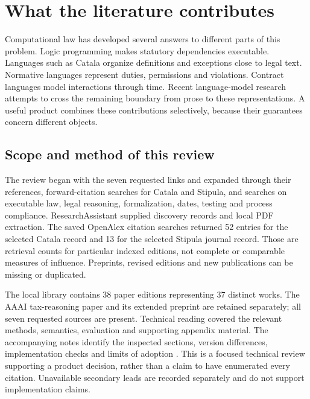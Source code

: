 \section{What the literature contributes}
\label{sec:literature}

Computational law has developed several answers to different parts of this
problem. Logic programming makes statutory dependencies executable. Languages
such as Catala organize definitions and exceptions close to legal text. Normative
languages represent duties, permissions and violations. Contract languages model
interactions through time. Recent language-model research attempts to cross the
remaining boundary from prose to these representations. A useful product combines
these contributions selectively, because their guarantees concern different
objects.

\subsection{Scope and method of this review}

The review began with the seven requested links and expanded through their
references, forward-citation searches for Catala and Stipula, and searches on
executable law, legal reasoning, formalization, dates, testing and process
compliance. ResearchAssistant supplied discovery records and local PDF extraction.
The saved OpenAlex citation searches returned 52 entries for the selected Catala
record and 13 for the selected Stipula journal record. Those are retrieval counts
for particular indexed editions, not complete or comparable measures of influence.
Preprints, revised editions and new publications can be missing or duplicated.

The local library contains 38 paper editions representing 37 distinct works.
The AAAI tax-reasoning paper and its extended preprint are retained separately;
all seven requested sources are present. Technical reading covered the relevant
methods, semantics, evaluation and supporting appendix material. The accompanying
notes identify the inspected sections, version differences, implementation checks
and limits of adoption \citep{libraryreview}. This is a focused technical review
supporting a product decision, rather than a claim to have enumerated every
citation. Unavailable secondary leads are recorded separately and do not support
implementation claims.


